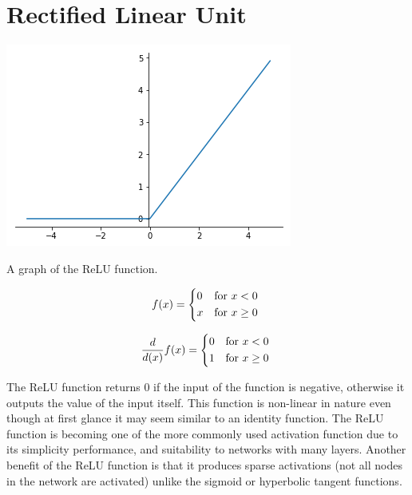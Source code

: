 \section{Rectified Linear Unit}\label{sec:relu}
\begin{marginfigure}
  \includegraphics{graphics/activation_functions/relu_function.png}
  \label{fig:relufunction}
  \caption{
    A graph of the ReLU function.
  }
\end{marginfigure}

\begin{equation}\label{relufunction}
    f(x) =
      \begin{dcases*}
                                       0 & \text{for $x < 0$} \\
                                       x & \text{for $x \geq 0$} \\
      \end{dcases*}
\end{equation}

\begin{equation}\label{relufunctionderivative}
    \frac{d}{d(x)}f(x) =
      \begin{dcases*}
                                       0 & \text{for $x < 0$} \\
                                       1 & \text{for $x \geq 0$} \\
      \end{dcases*}
\end{equation}

The ReLU function returns $0$ if the input of the function is negative, otherwise it outputs the value of the input itself. This function is non-linear in nature even though at first glance it may seem similar to an identity function. The ReLU function is becoming one of the more commonly used activation function due to its simplicity performance, and suitability to networks with many layers. Another benefit of the ReLU function is that it produces sparse activations (not all nodes in the network are activated) unlike the sigmoid or hyperbolic tangent functions. 

